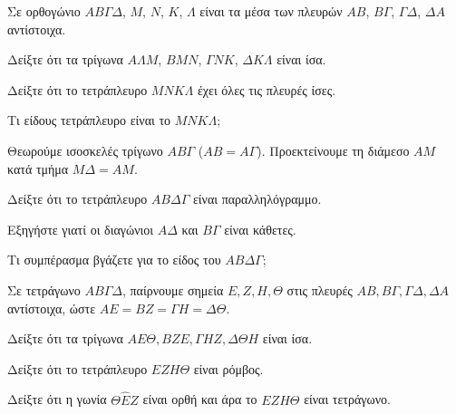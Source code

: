 \documentclass[11pt,a4paper,modern]{FFExercises}
\begin{document}
\askhsh
Σε ορθογώνιο $ΑΒ\varGamma\Delta$, $Μ$, $N$, $K$, $\Lambda$ είναι τα μέσα των πλευρών $ΑΒ$, $Β\varGamma$, $\varGamma\Delta$, $\Delta A$ αντίστοιχα.
\begin{alist}
    \item Δείξτε ότι τα τρίγωνα $A\Lambda M$, $B M N$, $\varGamma N K$, $\Delta K \Lambda$ είναι ίσα.
    \item Δείξτε ότι το τετράπλευρο $MNK\Lambda$ έχει όλες τις πλευρές ίσες.
    \item Τι είδους τετράπλευρο είναι το $MNK\Lambda$;
\end{alist}

\begin{center}
\end{center}

\askhsh
Θεωρούμε ισοσκελές τρίγωνο $ΑΒ\varGamma$ ($ΑΒ=Α\varGamma$). Προεκτείνουμε τη διάμεσο $ΑΜ$ κατά τμήμα $Μ\Delta = ΑΜ$.
\begin{alist}
    \item Δείξτε ότι το τετράπλευρο $ΑΒ\Delta\varGamma$ είναι παραλληλόγραμμο.
    \item Εξηγήστε γιατί οι διαγώνιοι $Α\Delta$ και $Β\varGamma$ είναι κάθετες.
    \item Τι συμπέρασμα βγάζετε για το είδος του $ΑΒ\Delta\varGamma$;
\end{alist}

\askhsh
Σε τετράγωνο $ΑΒ\varGamma\Delta$, παίρνουμε σημεία $E, Z, H, \Theta$ στις πλευρές $ΑΒ, Β\varGamma, \varGamma\Delta, \Delta A$ αντίστοιχα, ώστε $AE = BZ = \varGamma H = \Delta \Theta$.
\begin{alist}
    \item Δείξτε ότι τα τρίγωνα $AE\Theta, BZE, \varGamma HZ, \Delta\Theta H$ είναι ίσα.
    \item Δείξτε ότι το τετράπλευρο $EZH\Theta$ είναι ρόμβος.
    \item Δείξτε ότι η γωνία $\Theta\hat{E}Z$ είναι ορθή και άρα το $EZH\Theta$ είναι τετράγωνο.
\end{alist}
\end{document}
